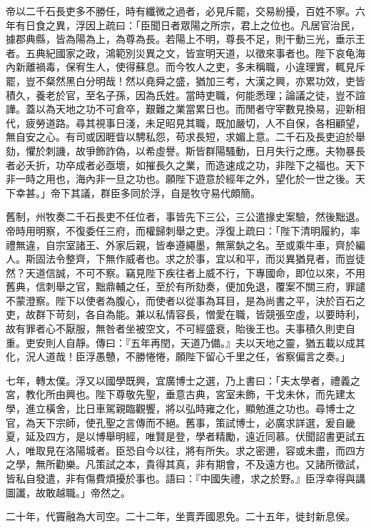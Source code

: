\begin{pinyinscope}
帝以二千石長吏多不勝任，時有纖微之過者，必見斥罷，交易紛擾，百姓不寧。六年有日食之異，浮因上疏曰：「臣聞日者眾陽之所宗，君上之位也。凡居官治民，據郡典縣，皆為陽為上，為尊為長。若陽上不明，尊長不足，則干動三光，垂示王者。五典紀國家之政，鴻範別災異之文，皆宣明天道，以徵來事者也。陛下哀龟海內新離禍毒，保宥生人，使得蘇息。而今牧人之吏，多未稱職，小違理實，輒見斥罷，豈不粲然黑白分明哉！然以堯舜之盛，猶加三考，大漢之興，亦累功效，吏皆積久，養老於官，至名子孫，因為氏姓。當時吏職，何能悉理；論議之徒，豈不諠譁。蓋以為天地之功不可倉卒，艱難之業當累日也。而閒者守宰數見換易，迎新相代，疲勞道路。尋其視事日淺，未足昭見其職，既加嚴切，人不自保，各相顧望，無自安之心。有司或因睚眥以騁私怨，苟求長短，求媚上意。二千石及長吏迫於舉劾，懼於刺譏，故爭飾詐偽，以希虛譽。斯皆群陽騷動，日月失行之應。夫物暴長者必夭折，功卒成者必亟壞，如摧長久之業，而造速成之功，非陛下之福也。天下非一時之用也，海內非一旦之功也。願陛下遊意於經年之外，望化於一世之後。天下幸甚。」帝下其議，群臣多同於浮，自是牧守易代頗簡。

舊制，州牧奏二千石長吏不任位者，事皆先下三公，三公遣掾史案驗，然後黜退。帝時用明察，不復委任三府，而權歸刺舉之吏。浮復上疏曰：「陛下清明履約，率禮無違，自宗室諸王、外家后親，皆奉遵繩墨，無黨埶之名。至或乘牛車，齊於編人。斯固法令整齊，下無作威者也。求之於事，宜以和平，而災異猶見者，而豈徒然？天道信誠，不可不察。竊見陛下疾往者上威不行，下專國命，即位以來，不用舊典，信刺舉之官，黜鼎輔之任，至於有所劾奏，便加免退，覆案不關三府，罪譴不蒙澄察。陛下以使者為腹心，而使者以從事為耳目，是為尚書之平，決於百石之吏，故群下苛刻，各自為能。兼以私情容長，憎愛在職，皆競張空虛，以要時利，故有罪者心不厭服，無咎者坐被空文，不可經盛衰，貽後王也。夫事積久則吏自重。吏安則人自靜。傳曰：『五年再閏，天道乃備。』夫以天地之靈，猶五載以成其化，況人道哉！臣浮愚戇，不勝惓惓，願陛下留心千里之任，省察偏言之奏。」

七年，轉太僕。浮又以國學既興，宜廣博士之選，乃上書曰：「夫太學者，禮義之宮，教化所由興也。陛下尊敬先聖，垂意古典，宮室未飾，干戈未休，而先建太學，進立橫舍，比日車駕親臨觀饗，將以弘時雍之化，顯勉進之功也。尋博士之官，為天下宗師，使孔聖之言傳而不絕。舊事，策試博士，必廣求詳選，爰自畿夏，延及四方，是以博舉明經，唯賢是登，學者精勵，遠近同慕。伏聞詔書更試五人，唯取見在洛陽城者。臣恐自今以往，將有所失。求之密邇，容或未盡，而四方之學，無所勸樂。凡策試之本，貴得其真，非有期會，不及遠方也。又諸所徵試，皆私自發遣，非有傷費煩擾於事也。語曰：『中國失禮，求之於野。』臣浮幸得與講圖讖，故敢越職。」帝然之。

二十年，代竇融為大司空。二十二年，坐賣弄國恩免。二十五年，徙封新息侯。


\end{pinyinscope}
